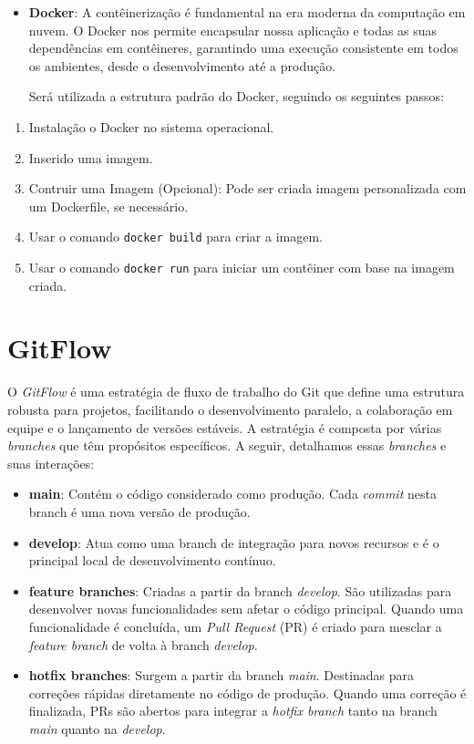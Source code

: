 \begin{itemize}
	\item \textbf{Docker}: A contêinerização é fundamental na era moderna da computação em nuvem. O Docker nos permite encapsular nossa aplicação e todas as suas dependências em contêineres, garantindo uma execução consistente em todos os ambientes, desde o desenvolvimento até a produção.
    \par Será utilizada a estrutura padrão do Docker, seguindo os seguintes passos:
\end{itemize}
\begin{enumerate}
  \item Instalação o Docker no sistema operacional.
  \item Inserido uma imagem.
  \item Contruir uma Imagem (Opcional): Pode ser criada imagem personalizada com um Dockerfile, se necessário.
  \item Usar o comando \texttt{docker build} para criar a imagem.
  \item Usar o comando \texttt{docker run} para iniciar um contêiner com base na imagem criada.
\end{enumerate}


\section{GitFlow}
O \textit{GitFlow} é uma estratégia de fluxo de trabalho do Git que define uma estrutura robusta para projetos, facilitando o desenvolvimento paralelo, a colaboração em equipe e o lançamento de versões estáveis. A estratégia é composta por várias \textit{branches} que têm propósitos específicos. A seguir, detalhamos essas \textit{branches} e suas interações:

\begin{itemize}
	\item \textbf{main}: Contém o código considerado como produção. Cada \textit{commit} nesta branch é uma nova versão de produção.
	      
	\item \textbf{develop}: Atua como uma branch de integração para novos recursos e é o principal local de desenvolvimento contínuo.
	      
	\item \textbf{feature branches}: Criadas a partir da branch \textit{develop}. São utilizadas para desenvolver novas funcionalidades sem afetar o código principal. Quando uma funcionalidade é concluída, um \textit{Pull Request} (PR) é criado para mesclar a \textit{feature branch} de volta à branch \textit{develop}.
	      
	\item \textbf{hotfix branches}: Surgem a partir da branch \textit{main}. Destinadas para correções rápidas diretamente no código de produção. Quando uma correção é finalizada, PRs são abertos para integrar a \textit{hotfix branch} tanto na branch \textit{main} quanto na \textit{develop}.
\end{itemize}


